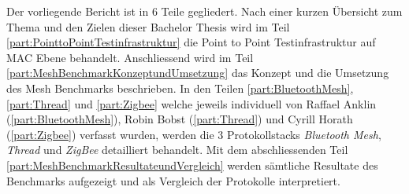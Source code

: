 Der vorliegende Bericht ist in 6 Teile gegliedert.
Nach einer kurzen Übersicht zum Thema und den Zielen dieser Bachelor Thesis wird im Teil \ref{part:PointtoPointTestinfrastruktur} die Point to Point Testinfrastruktur auf MAC Ebene behandelt.
Anschliessend wird im Teil \ref{part:MeshBenchmarkKonzeptundUmsetzung} das Konzept und die Umsetzung des Mesh Benchmarks beschrieben.
In den Teilen \ref{part:BluetoothMesh}, \ref{part:Thread} und \ref{part:Zigbee} welche jeweils individuell von Raffael Anklin (\ref{part:BluetoothMesh}), Robin Bobst (\ref{part:Thread}) und Cyrill Horath (\ref{part:Zigbee}) verfasst wurden, werden die 3 Protokollstacks \textit{Bluetooth Mesh}, \textit{Thread} und \textit{ZigBee} detailliert behandelt.
Mit dem abschliessenden Teil \ref{part:MeshBenchmarkResultateundVergleich} werden sämtliche Resultate des Benchmarks aufgezeigt und als Vergleich der Protokolle interpretiert.

